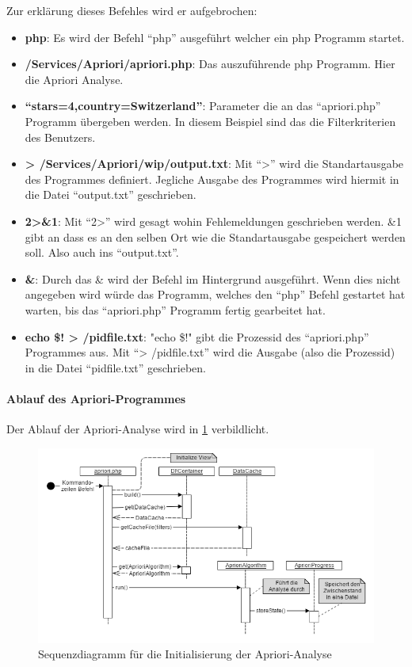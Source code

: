 Zur erklärung dieses Befehles wird er aufgebrochen:
\begin{itemize}
	\item \textbf{php}: Es wird der Befehl "`php"' ausgeführt welcher ein \gls{php} Programm startet.
	\item \textbf{/Services/Apriori/apriori.php}: Das auszuführende \gls{php} Programm. Hier die Apriori Analyse.
	\item \textbf{``stars=4,country=Switzerland''}: Parameter die an das "`apriori.php"' Programm übergeben werden. In diesem Beispiel sind das die Filterkriterien des Benutzers.
	\item \textbf{> /Services/Apriori/wip/output.txt}: Mit "`>"' wird die Standartausgabe des Programmes definiert. Jegliche Ausgabe des Programmes wird hiermit in die Datei "`output.txt"' geschrieben.
	\item \textbf{2>\&1}: Mit "`2>"' wird gesagt wohin Fehlemeldungen geschrieben werden. \&1 gibt an dass es an den selben Ort wie die Standartausgabe gespeichert werden soll. Also auch ins "`output.txt"'.
	\item \textbf{\&}: Durch das \& wird der Befehl im Hintergrund ausgeführt. Wenn dies nicht angegeben wird würde das Programm, welches den "`php"' Befehl gestartet hat warten, bis das "`apriori.php"' Programm fertig gearbeitet hat.
	\item \textbf{echo \$! > /pidfile.txt}: "echo \$!" gibt die Prozessid des "`apriori.php"' Programmes aus. Mit "`> /pidfile.txt"' wird die Ausgabe (also die Prozessid) in die Datei "`pidfile.txt"' geschrieben.
\end{itemize}

\paragraph{Ablauf des Apriori-Programmes}
Der Ablauf der Apriori-Analyse wird in \cref{fig:proofofconcept:architektur:hintergrundprozesser:1} verbildlicht.

\begin{figure}[H]
	\centering
	\includegraphics[width=1\textwidth]{images/diagram-sequence-apriori}
	\caption{Sequenzdiagramm für die Initialisierung der Apriori-Analyse}
	\label{fig:proofofconcept:architektur:hintergrundprozesser:1}
\end{figure}

